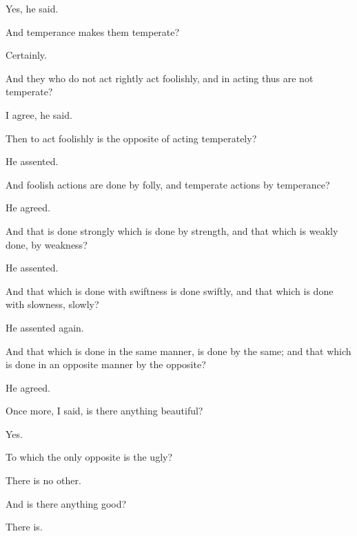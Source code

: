 \documentclass[11pt,letter]{article}
\begin{document}
\par  Yes, he said.

\par  And temperance makes them temperate?

\par  Certainly.

\par  And they who do not act rightly act foolishly, and in acting thus are not temperate?

\par  I agree, he said.

\par  Then to act foolishly is the opposite of acting temperately?

\par  He assented.

\par  And foolish actions are done by folly, and temperate actions by temperance?

\par  He agreed.

\par  And that is done strongly which is done by strength, and that which is weakly done, by weakness?

\par  He assented.

\par  And that which is done with swiftness is done swiftly, and that which is done with slowness, slowly?

\par  He assented again.

\par  And that which is done in the same manner, is done by the same; and that which is done in an opposite manner by the opposite?

\par  He agreed.

\par  Once more, I said, is there anything beautiful?

\par  Yes.

\par  To which the only opposite is the ugly?

\par  There is no other.

\par  And is there anything good?

\par  There is.
\end{document}
